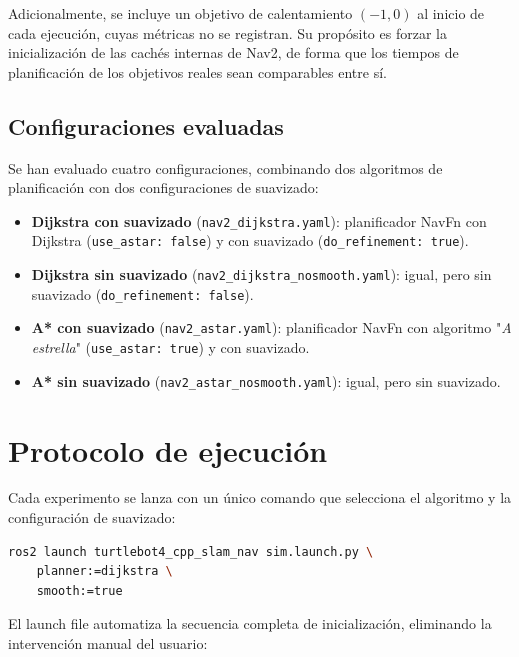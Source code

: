 Adicionalmente, se incluye un objetivo de calentamiento $(-1, 0)$ al inicio de cada ejecución, cuyas métricas no se registran. Su propósito es forzar la inicialización de las cachés internas de Nav2, de forma que los tiempos de planificación de los objetivos reales sean comparables entre sí.

\subsection{Configuraciones evaluadas}

Se han evaluado cuatro configuraciones, combinando dos algoritmos de planificación con dos configuraciones de suavizado:

\begin{itemize}
    \item \textbf{Dijkstra con suavizado} (\texttt{nav2\_dijkstra.yaml}): planificador NavFn con Dijkstra (\texttt{use\_astar: false}) y con suavizado (\texttt{do\_refinement: true}).
    \item \textbf{Dijkstra sin suavizado} (\texttt{nav2\_dijkstra\_nosmooth.yaml}): igual, pero sin suavizado (\texttt{do\_refinement: false}).
    \item \textbf{A* con suavizado} (\texttt{nav2\_astar.yaml}): planificador NavFn con algoritmo "\textit{A estrella}" (\texttt{use\_astar: true}) y con suavizado.
    \item \textbf{A* sin suavizado} (\texttt{nav2\_astar\_nosmooth.yaml}): igual, pero sin suavizado.
\end{itemize}

\section{Protocolo de ejecución}

Cada experimento se lanza con un único comando que selecciona el algoritmo y la configuración de suavizado:

\begin{lstlisting}[language=bash, basicstyle=\ttfamily\small, backgroundcolor=\color{gray!15}, frame=single]
ros2 launch turtlebot4_cpp_slam_nav sim.launch.py \
    planner:=dijkstra \
    smooth:=true
\end{lstlisting}

El launch file automatiza la secuencia completa de inicialización, eliminando la intervención manual del usuario:

